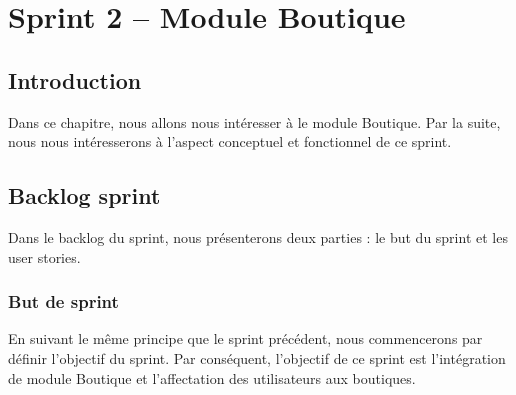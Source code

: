 \chapter{Sprint 2 – Module Boutique}
	
\section*{Introduction}
Dans ce chapitre, nous allons nous intéresser à le module Boutique. Par la suite, nous nous intéresserons à l’aspect conceptuel et fonctionnel de ce sprint.

\section[Backlog sprint]{Backlog sprint}
Dans le backlog du sprint, nous présenterons deux parties :  le but du sprint et les user stories.

\subsection[But de sprint]{But de sprint}
En suivant le même principe que le sprint précédent, nous commencerons par définir l'objectif du sprint. Par conséquent, l'objectif de ce sprint est l'intégration de module Boutique et l’affectation des utilisateurs aux boutiques.
